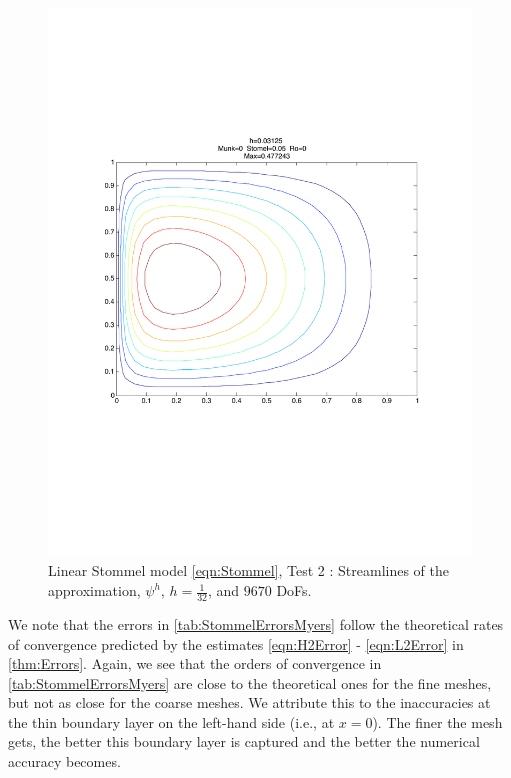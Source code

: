 \begin{figure}%
  \begin{center}
    \includegraphics[scale=0.5]{Figures/linearStommelMyers.pdf}
    \caption{Linear Stommel model \eqref{eqn:Stommel}, Test 2 \cite{Myers}: Streamlines of the approximation,
    $\psi^h$, $h=\frac{1}{32}$, and $9670$ DoFs.}
    \label{fig:StommelMyers}
  \end{center}
\end{figure}

We note that the errors in \autoref{tab:StommelErrorsMyers} follow the
theoretical rates of convergence predicted by the estimates \eqref{eqn:H2Error}
- \eqref{eqn:L2Error} in \autoref{thm:Errors}. Again, we see that the orders of
convergence in \autoref{tab:StommelErrorsMyers} are close to the theoretical
ones for the fine meshes, but not as close for the coarse meshes. We attribute
this to the inaccuracies at the thin boundary layer on the left-hand side (i.e.,
at $x=0$). The finer the mesh gets, the better this boundary layer is captured
and the better the numerical accuracy becomes.

